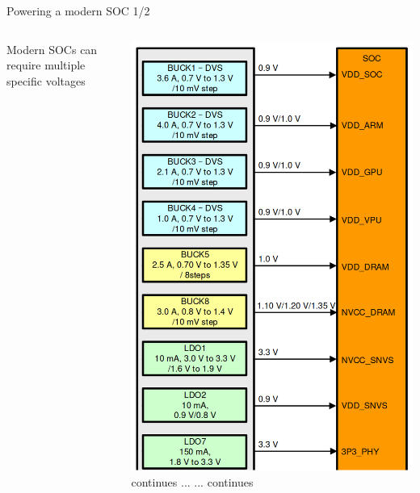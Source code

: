 \documentclass[10pt]{beamer}
\begin{document}
\begin{frame}[t]{Powering a modern SOC 1/2}%
	\begin{columns}[onlytextwidth]
	 Modern SOCs can require multiple specific voltages

	\includegraphics[width=1\linewidth]{img/imx8_power_split1.png}%
	\center continues ...
	\vspace{50pt}
	\center ... continues \\[12pt]

\end{columns}
\end{frame}
\end{document}
